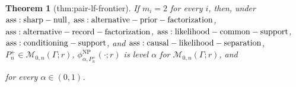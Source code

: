 \documentclass{article}
\newtheorem{theorem}{Theorem}
\begin{document}
\begin{theorem}[thm:pair-lf-frontier]\label{thm:pair-lf-frontier}
If \(m_i=2\) for every \(i\), then, under \({\rm ass:sharp-null}\), \({\rm ass:alternative-prior-factorization}\), \({\rm ass:alternative-record-factorization}\), \({\rm ass:likelihood-common-support}\), \({\rm ass:conditioning-support}\), and \({\rm ass:causal-likelihood-separation}\), \(P_n^+\in\mathcal M_{0,n}(\Gamma;r)\), \(\phi_{\alpha,P_n^+}^{\mathrm{NP}}(\cdot;r)\) is level \(\alpha\) for \(\mathcal M_{0,n}(\Gamma;r)\), and \par\noindent {}\par\noindent for every \(\alpha\in(0,1)\).
\end{theorem}
\end{document}
